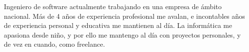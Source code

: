 

\begin{cvparagraph}

Ingeniero de software actualmente trabajando en una empresa de ámbito nacional. Más de 4 años de experiencia profesional me avalan, e incontables años de experiencia personal y educativa me mantienen al día.
La informática me apasiona desde niño, y por ello me mantengo al día con proyectos personales, y de vez en cuando, como freelance. 

\end{cvparagraph}